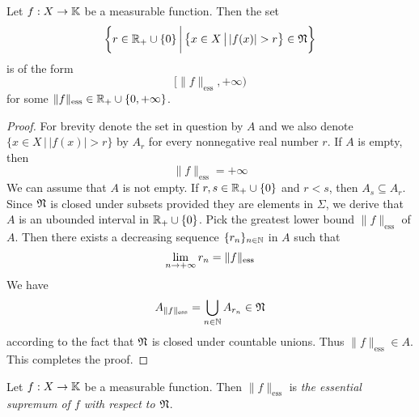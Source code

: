 \begin{fact}\label{fact:existence_of_essential_supremum}
    Let $f:X\rightarrow \mathbb{K}$ be a measurable function. Then the set
    $$\bigg\{r \in {\mathbb R}_+\cup \{0\}\,\bigg|\,\big\{x\in X\,\big|\,|f(x)| > r\big\} \in {\mathfrak N}\bigg\}$$
    is of the form
    $$\bigg[\lVert f \rVert_{\mathrm{ess}},+\infty\bigg)$$
    for some $\lVert f \rVert_{\mathrm{ess}} \in {\mathbb R}_+\cup \{0,+\infty\}$.
\end{fact}
\begin{proof}
    For brevity denote the set in question by $A$ and we also denote $\big\{x\in X\,\big|\,|f(x)| > r\big\}$ by $A_r$ for every nonnegative real number $r$. If $A$ is empty, then
    $$\lVert f \rVert_{\mathrm{ess}} = +\infty$$
    We can assume that $A$ is not empty. If $r,s \in {\mathbb R}_+\cup \{0\}$ and $r < s$, then $A_s \subseteq A_r$. Since ${\mathfrak N}$ is closed under subsets provided they are elements in $\Sigma$, we derive that $A$ is an ubounded interval in ${\mathbb R}_+\cup \{0\}$. Pick the greatest lower bound $\lVert f \rVert_{\mathrm{ess}}$ of $A$. Then there exists a decreasing sequence $\{r_n\}_{n\in {\mathbb N}}$ in $A$ such that 
    $$\lim_{n\rightarrow +\infty}r_n = \lVert f \rVert_{\mathrm{ess}}$$
    We have
    $$A_{\lVert f \rVert_{\mathrm{ess}}} = \bigcup_{n \in {\mathbb N}}A_{r_n} \in {\mathfrak N}$$ 
    according to the fact that ${\mathfrak N}$ is closed under countable unions. Thus $\lVert f \rVert_{\mathrm{ess}} \in A$. This completes the proof.
\end{proof}


\begin{definition}
    Let $f:X \rightarrow \mathbb{K}$ be a measurable function. Then $\lVert f \rVert_{\mathrm{ess}}$ is \textit{the essential supremum of $f$ with respect to ${\mathfrak N}$}.
\end{definition}

